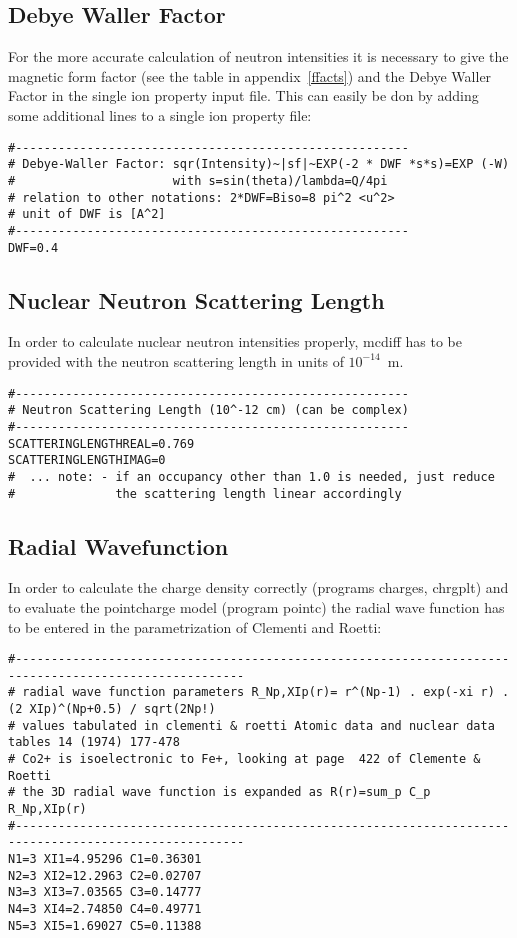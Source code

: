 \subsection{Debye Waller Factor}

For the more accurate calculation of neutron intensities it is
necessary to give the magnetic form factor (see the table in appendix~\ref{ffacts})
and the Debye Waller Factor in the single ion property input file. This can
easily be don by adding some additional lines to a single ion property file:
{\footnotesize
\begin{verbatim}
#-------------------------------------------------------
# Debye-Waller Factor: sqr(Intensity)~|sf|~EXP(-2 * DWF *s*s)=EXP (-W)
#                      with s=sin(theta)/lambda=Q/4pi
# relation to other notations: 2*DWF=Biso=8 pi^2 <u^2>
# unit of DWF is [A^2]
#-------------------------------------------------------
DWF=0.4
\end{verbatim}
}

\subsection{Nuclear Neutron Scattering Length}

In order to calculate nuclear neutron intensities properly, {\prg mcdiff} has to
be provided with the neutron scattering length in units of $10^{-14}$~m.
{\footnotesize
\begin{verbatim}
#-------------------------------------------------------
# Neutron Scattering Length (10^-12 cm) (can be complex)
#-------------------------------------------------------
SCATTERINGLENGTHREAL=0.769
SCATTERINGLENGTHIMAG=0
#  ... note: - if an occupancy other than 1.0 is needed, just reduce 
#              the scattering length linear accordingly
\end{verbatim}
}

\subsection{Radial Wavefunction}

In order to calculate the charge density correctly (programs {\prg charges, chrgplt}) and
to evaluate the pointcharge model (program {\prg pointc}) the radial wave function has to be entered in the %
parametrization of Clementi and Roetti:
{\footnotesize
\begin{verbatim}
#------------------------------------------------------------------------------------------------------
# radial wave function parameters R_Np,XIp(r)= r^(Np-1) . exp(-xi r) . (2 XIp)^(Np+0.5) / sqrt(2Np!)  
# values tabulated in clementi & roetti Atomic data and nuclear data tables 14 (1974) 177-478
# Co2+ is isoelectronic to Fe+, looking at page  422 of Clemente & Roetti 
# the 3D radial wave function is expanded as R(r)=sum_p C_p R_Np,XIp(r)
#------------------------------------------------------------------------------------------------------
N1=3 XI1=4.95296 C1=0.36301 
N2=3 XI2=12.2963 C2=0.02707 
N3=3 XI3=7.03565 C3=0.14777
N4=3 XI4=2.74850 C4=0.49771 
N5=3 XI5=1.69027 C5=0.11388 
\end{verbatim}
}

